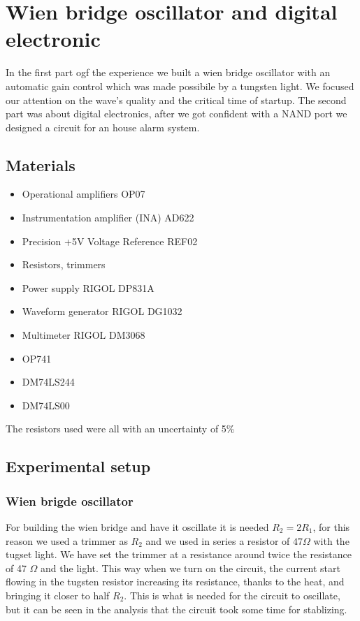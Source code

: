 
\chapter{Wien bridge oscillator and digital electronic}
In the first part ogf the experience we built a wien bridge oscillator with an automatic gain control which was made possibile by a tungsten light. We focused our attention on the wave's quality and the critical time of startup. The second part was about digital electronics, after we got confident with a NAND port we designed a circuit for an house alarm system.
\section{Materials}
\begin{itemize}
\item Operational amplifiers OP07
\item Instrumentation amplifier (INA) AD622
\item Precision +5V Voltage Reference REF02
\item Resistors, trimmers
\item Power supply RIGOL DP831A
\item Waveform generator RIGOL DG1032
\item Multimeter RIGOL DM3068
\item OP741
\item DM74LS244
\item DM74LS00
\end{itemize}
The resistors used were all with an uncertainty of 5\%

\section{Experimental setup}
\subsection{Wien brigde oscillator}
For building the wien bridge and have it oscillate it is needed $R_2 = 2 R_1$, for this reason we used a trimmer as $R_2$ and we used in series a resistor of $47 \Omega$ with the tugset light. We have  set the trimmer at a resistance around twice the resistance of 47 $\Omega$ and the light. This way when we turn on the circuit, the current start flowing in the tugsten resistor increasing its resistance, thanks to the heat, and bringing it closer to half $R_2$. This is what is needed for the circuit to oscillate, but it can be seen in the analysis that the circuit took some time for stablizing.
